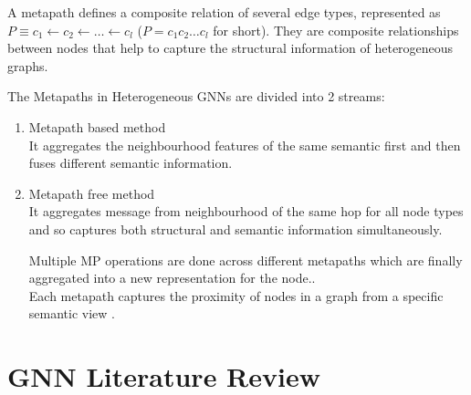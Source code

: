 \documentclass{report} %
\begin{document}
A metapath defines a composite relation of several edge types, represented as \(P \equiv c_1 \leftarrow c_2 \leftarrow \ldots \leftarrow c_l\) (\(P = c_1c_2 \ldots c_l\) for short).
They are composite relationships between nodes that help to capture the structural information of heterogeneous graphs.

The Metapaths in Heterogeneous \ac{GNN}s are divided into 2 streams:
\begin{enumerate}
    \item Metapath based method\\
    It aggregates the neighbourhood features of the same semantic first and then fuses different semantic information.
    \item Metapath free method\\
    It aggregates message from neighbourhood of the same hop for all node types and so captures both structural and semantic information simultaneously.

Multiple \ac{MP} operations are done across different metapaths which are finally aggregated into a new representation for the node.\cite{ML HGNN-2023}.\\

Each metapath captures the proximity of nodes in a graph from a specific semantic view \cite{HGNN-2020}.

\end{enumerate}

\section{\ac{GNN} Literature Review}\label{sec:GNN Literature Review}
\end{document}
